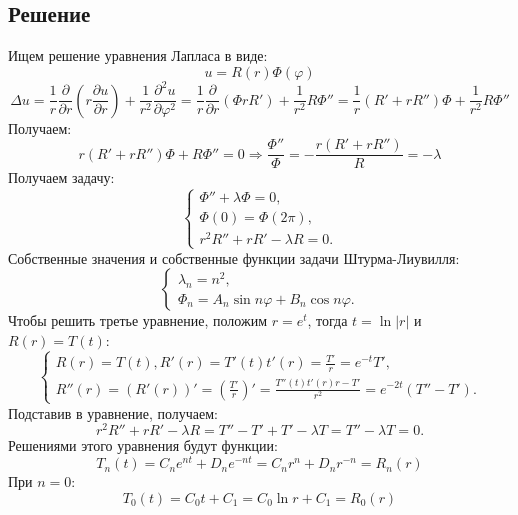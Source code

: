 \documentclass[11pt]{article}
\begin{document}
\subsection{Решение}
\label{sec:org83a8721}
Ищем решение уравнения Лапласа в виде:
\begin{equation*}
u = R(r)\Phi(\varphi)
\end{equation*}
\begin{equation*}
\Delta u = \frac1r\frac{\partial}{\partial r}\left(r\frac{\partial u}{\partial r}\right) +
\frac1{r^2}\frac{\partial^2 u}{\partial\varphi^2} = \frac1r\frac{\partial}{\partial r}\left(\Phi rR'\right) + \frac1{r^2}R\Phi'' =
\frac1r\left(R' + rR''\right)\Phi + \frac1{r^2}R\Phi''
\end{equation*}
Получаем:
\begin{equation*}
r(R' + rR'')\Phi + R\Phi'' = 0 \Rightarrow \frac{\Phi''}{\Phi} = -\frac{r(R' + rR'')}{R} = -\lambda
\end{equation*}
Получаем задачу:
\begin{equation}
\begin{cases}
\Phi'' + \lambda\Phi = 0, \\
\Phi(0) = \Phi(2\pi), \\
r^2R'' + rR' - \lambda R = 0.
\end{cases}
\end{equation}
Собственные значения и собственные функции задачи Штурма-Лиувилля:
\begin{equation*}
\begin{cases}
\lambda_n = n^2, \\
\Phi_n = A_n\sin n\varphi + B_n\cos n\varphi.
\end{cases}
\end{equation*}
Чтобы решить третье уравнение, положим $r = e^t$, тогда $t = \ln |r|$ и $R(r) = T(t)$:
\begin{equation*}
\begin{cases}
R(r) = T(t), R'(r) = T'(t)t'(r) = \frac{T'}r = e^{-t}T', \\
R''(r) = (R'(r))' = \left(\frac{T'}r\right)' = \frac{T''(t)t'(r)r - T'}{r^2} = e^{-2t}(T'' - T').
\end{cases}
\end{equation*}
Подставив в уравнение, получаем:
\begin{equation}
r^2R'' + rR' - \lambda R = T'' - T' + T'  - \lambda T = T'' - \lambda T = 0.
\end{equation}
Решениями этого уравнения будут функции:
\begin{equation*}
T_n(t) = C_ne^{nt} + D_ne^{-nt} = C_nr^n + D_nr^{-n} = R_n(r)
\end{equation*}
При $n = 0$:
\begin{equation*}
T_0(t) = C_0t + C_1 = C_0\ln r + C_1 = R_0(r)
\end{equation*}
\end{document}
